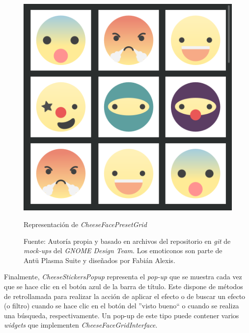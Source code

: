 \documentclass[a4paper,openright,12pt]{report}
\begin{document}
\begin{figure}[!h]
  \centering
    \includegraphics{../images/cheese-mockup-face-preset-grid.png}\par
  \caption{Representación de \textit{{CheeseFacePresetGrid}}}
    \label{fig:cheese-sticker-button}
  \caption*{Fuente: Autoría propia y basado en archivos del repositorio en
    \textit{git} de \textit{mock-ups} del \textit{GNOME Design Team}. Los
    emoticonos son parte de Antü Plasma Suite y diseñados por Fabián Alexis.}
\end{figure}

Finalmente, \textit{CheeseStickersPopup} representa el \textit{pop-up} que se
muestra cada vez que se hace clic en el botón azul de la barra de título. Este
dispone de métodos de retrollamada para realizar la acción de aplicar el efecto
o de buscar un efecto (o filtro) cuando se hace clic en el botón del ''visto
bueno`` o cuando se realiza una búsqueda, respectivamente. Un pop-up de este
tipo puede contener varios \textit{widgets} que implementen
\textit{CheeseFaceGridInterface}.
\end{document}
